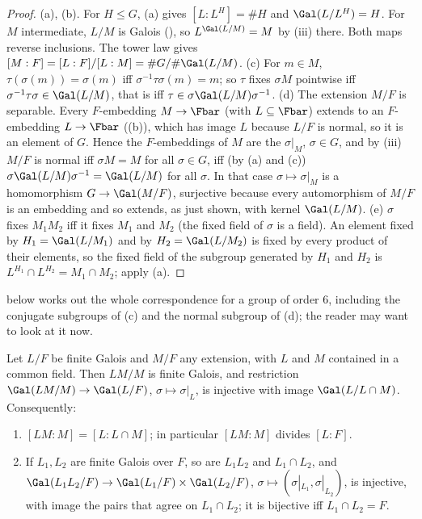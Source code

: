 \begin{proof}
(a), (b). For $H\le G$, (a) gives $[L:L^H]=\#H$ and $\Gal(L/L^H)=H$. For $M$ intermediate, $L/M$ is Galois
(), so $L^{\Gal(L/M)}=M$ by (iii) there. Both maps reverse inclusions. The tower law gives $[M:F]=[L:F]/[L:M]=
\#G/\#\Gal(L/M)$.
(c) For $m\in M$, $\tau(\sigma(m))=\sigma(m)$ iff $\sigma^{-1}\tau\sigma(m)=m$; so $\tau$ fixes $\sigma M$ pointwise iff $\sigma^{-1}\tau\sigma\in\Gal(L/M)$, that is
iff $\tau\in\sigma\Gal(L/M)\sigma^{-1}$.
(d) The extension $M/F$ is separable. Every $F$-embedding $M\to\Fbar$ (with $L\subseteq\Fbar$) extends to an $F$-embedding $L\to\Fbar$
((b)), which has image $L$ because $L/F$ is normal, so it is an element of $G$. Hence the $F$-embeddings of $M$ are the
$\sigma|_M$, $\sigma\in G$, and by (iii) $M/F$ is normal iff $\sigma M=M$ for all $\sigma\in G$, iff (by (a) and (c))
$\sigma\Gal(L/M)\sigma^{-1}=\Gal(L/M)$ for all $\sigma$. In that case $\sigma\mapsto\sigma|_M$ is a homomorphism $G\to\Gal(M/F)$, surjective because every
automorphism of $M/F$ is an embedding and so extends, as just shown, with kernel $\Gal(L/M)$.
(e) $\sigma$ fixes $M_1M_2$ iff it fixes $M_1$ and $M_2$ (the fixed field of $\sigma$ is a field). An element fixed by $H_1=\Gal(L/M_1)$ and by $H_2=\Gal(L/M_2)$
is fixed by every product of their elements, so the fixed field of the subgroup generated by $H_1$ and $H_2$ is $L^{H_1}\cap L^{H_2}=M_1\cap M_2$; apply (a).
\end{proof}

 below works out the whole correspondence for a group of order $6$, including the conjugate subgroups of (c) and the normal subgroup of (d);
the reader may want to look at it now.

\begin{proposition}[Translation]\label{prop:galois:translation}
Let $L/F$ be finite Galois and $M/F$ any extension, with $L$ and $M$ contained in a common field. Then $LM/M$ is finite Galois, and restriction
$\Gal(LM/M)\to\Gal(L/F)$, $\sigma\mapsto\sigma|_L$, is injective with image $\Gal(L/L\cap M)$. Consequently:
\begin{enumerate}[label=(\alph*)]
\item $[LM:M]=[L:L\cap M]$; in particular $[LM:M]$ divides $[L:F]$.
\item If $L_1,L_2$ are finite Galois over $F$, so are $L_1L_2$ and $L_1\cap L_2$, and $\Gal(L_1L_2/F)\to\Gal(L_1/F)\times\Gal(L_2/F)$, $\sigma\mapsto(\sigma|_{L_1},
\sigma|_{L_2})$, is injective, with image the pairs that agree on $L_1\cap L_2$; it is bijective iff $L_1\cap L_2=F$.
\end{enumerate}
\end{proposition}

